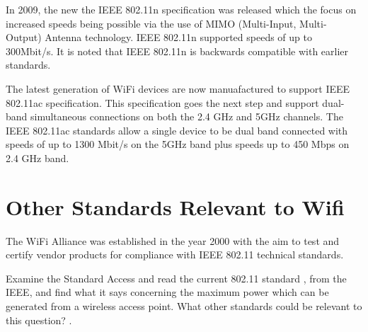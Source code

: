 In 2009, the new the IEEE 802.11n specification was released which the
focus on increased speeds being possible via the use of MIMO (Multi-Input,
Multi-Output) Antenna technology. IEEE 802.11n supported speeds of up
to 300Mbit/s. It is noted that IEEE 802.11n is backwards compatible with
earlier standards.

The latest generation of WiFi devices are now manuafactured to support
IEEE 802.11ac specification.  This specification goes the next step and
support dual-band simultaneous connections on both the 2.4 GHz and 5GHz
channels. The IEEE 802.11ac standards allow a single device to be dual
band connected with speeds of up to 1300 Mbit/s on the 5GHz band plus
speeds up to 450 Mbps on 2.4 GHz band.



\section{Other Standards Relevant to Wifi}

The WiFi Alliance was established in the year 2000 with the aim to test
and certify vendor products for compliance with IEEE 802.11 technical
standards.

\begin{exercise}{Examine the Standard}
Access and read the current 802.11 standard \cite{ieee802_11standard}, from the IEEE, and find what it says
concerning the maximum power which can be generated from a wireless access point.
What other standards could be relevant to this question? \cite{alhasmawi2020}.
\end{exercise}
